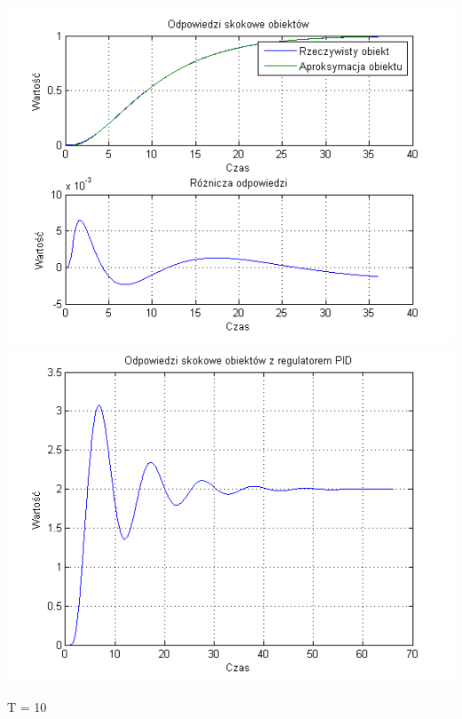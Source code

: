 \documentclass[10pt,a4paper]{article}
\begin{document}
\begin{center}
\includegraphics[scale=1]{images/dwa/skrypt_101.png}\\
\includegraphics[scale=1]{images/dwa/skrypt_102.png}\\
\end{center}
\newpage
T = 10
\end{document}
